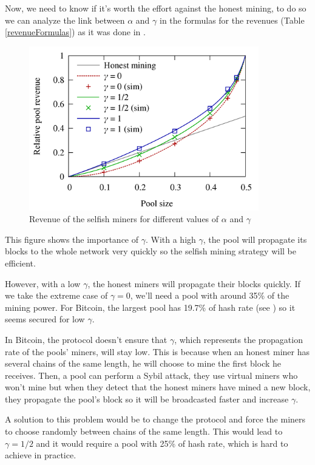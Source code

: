Now, we need to know if it's worth the effort against the honest mining, to do so we can analyze the link between $\alpha$ and $\gamma$ in the formulas for the revenues (Table \ref{revenueFormulas}) as it was done in \cite{majority_not_enough}. \newline

\begin{figure}[ht]
\centering
\includegraphics[width=10cm]{Figures/poolRevenue}
\caption{Revenue of the selfish miners for different values of $\alpha$ and $\gamma$}
\end{figure}
\medskip

This figure shows the importance of $\gamma$. With a high $\gamma$, the pool will propagate its blocks to the whole network very quickly so the selfish mining strategy will be efficient.

However, with a low $\gamma$, the honest miners will propagate their blocks quickly. If we take the extreme case of $\gamma = 0$, we'll need a pool with around 35\% of the mining power. For Bitcoin, the largest pool has 19.7\% of hash rate (see \cite{hashrate_pools}) so it seems secured for low $\gamma$.\newline

In Bitcoin, the protocol doesn't ensure that $\gamma$, which represents the propagation rate of the pools' miners, will stay low. This is because when an honest miner has several chains of the same length, he will choose to mine the first block he receives. Then, a pool can perform a Sybil attack, they use virtual miners who won't mine but when they detect that the honest miners have mined a new block, they propagate the pool's block so it will be broadcasted faster and increase $\gamma$. \newline

A solution to this problem would be to change the protocol and force the miners to choose randomly between chains of the same length. This would lead to $\gamma = 1/2$ and it would require a pool with 25\% of hash rate, which is hard to achieve in practice.
